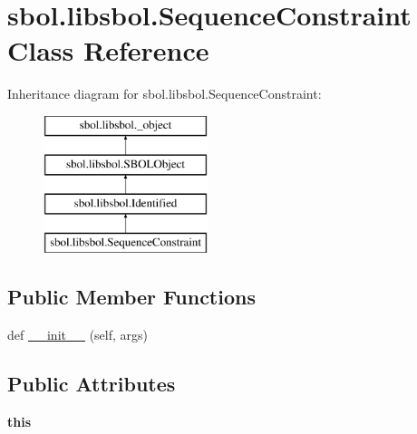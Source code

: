 \hypertarget{classsbol_1_1libsbol_1_1_sequence_constraint}{}\section{sbol.\+libsbol.\+Sequence\+Constraint Class Reference}
\label{classsbol_1_1libsbol_1_1_sequence_constraint}
Inheritance diagram for sbol.\+libsbol.\+Sequence\+Constraint\+:\begin{figure}[H]
\begin{center}
\leavevmode
\includegraphics[height=4.000000cm]{classsbol_1_1libsbol_1_1_sequence_constraint}
\end{center}
\end{figure}
\subsection*{Public Member Functions}
\begin{DoxyCompactItemize}
\item 
def \hyperlink{classsbol_1_1libsbol_1_1_sequence_constraint_a6c4c8903e1ca9fbf304b9be76b752ad7}{\+\_\+\+\_\+init\+\_\+\+\_\+} (self, args)
\end{DoxyCompactItemize}
\subsection*{Public Attributes}
\begin{DoxyCompactItemize}
\item 
{\bfseries this}\hypertarget{classsbol_1_1libsbol_1_1_sequence_constraint_a92e7bc9d91b85a9c5182b0f361a2927e}{}\label{classsbol_1_1libsbol_1_1_sequence_constraint_a92e7bc9d91b85a9c5182b0f361a2927e}

\end{DoxyCompactItemize}
